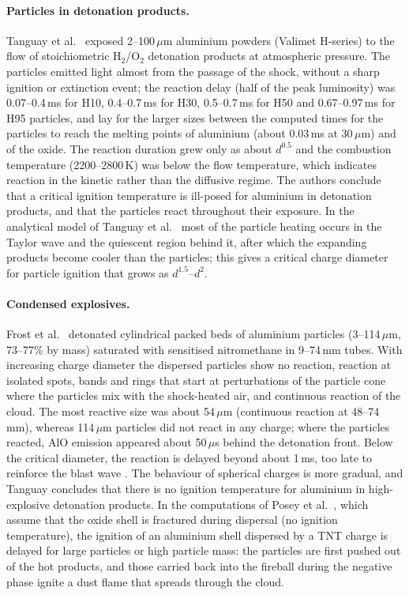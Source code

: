\documentclass{article}
\begin{document}
\paragraph{Particles in detonation products.} Tanguay et al.\ \cite{tanguay2009,tanguay2009thesis} exposed 2--100\,$\mu$m aluminium powders (Valimet H-series) to the flow of stoichiometric H$_2$/O$_2$ detonation products at atmospheric pressure. The particles emitted light almost from the passage of the shock, without a sharp ignition or extinction event; the reaction delay (half of the peak luminosity) was 0.07--0.4\,ms for H10, 0.4--0.7\,ms for H30, 0.5--0.7\,ms for H50 and 0.67--0.97\,ms for H95 particles, and lay for the larger sizes between the computed times for the particles to reach the melting points of aluminium (about 0.03\,ms at 30\,$\mu$m) and of the oxide. The reaction duration grew only as about $d^{0.5}$ and the combustion temperature (2200--2800\,K) was below the flow temperature, which indicates reaction in the kinetic rather than the diffusive regime. The authors conclude that a critical ignition temperature is ill-posed for aluminium in detonation products, and that the particles react throughout their exposure. In the analytical model of Tanguay et al.\ \cite{tanguay2007} most of the particle heating occurs in the Taylor wave and the quiescent region behind it, after which the expanding products become cooler than the particles; this gives a critical charge diameter for particle ignition that grows as $d^{1.5}$--$d^2$.

\paragraph{Condensed explosives.} Frost et al.\ \cite{frost2002,frost2006} detonated cylindrical packed beds of aluminium particles (3--114\,$\mu$m, 73--77\% by mass) saturated with sensitised nitromethane in 9--74\,mm tubes. With increasing charge diameter the dispersed particles show no reaction, reaction at isolated spots, bands and rings that start at perturbations of the particle cone where the particles mix with the shock-heated air, and continuous reaction of the cloud. The most reactive size was about 54\,$\mu$m (continuous reaction at 48--74\,mm), whereas 114\,$\mu$m particles did not react in any charge; where the particles reacted, AlO emission appeared about 50\,$\mu$s behind the detonation front. Below the critical diameter, the reaction is delayed beyond about 1\,ms, too late to reinforce the blast wave \cite{tanguay2009thesis}. The behaviour of spherical charges is more gradual, and Tanguay \cite{tanguay2009thesis} concludes that there is no ignition temperature for aluminium in high-explosive detonation products. In the computations of Posey et al.\ \cite{posey2021}, which assume that the oxide shell is fractured during dispersal (no ignition temperature), the ignition of an aluminium shell dispersed by a TNT charge is delayed for large particles or high particle mass: the particles are first pushed out of the hot products, and those carried back into the fireball during the negative phase ignite a dust flame that spreads through the cloud.
\end{document}
